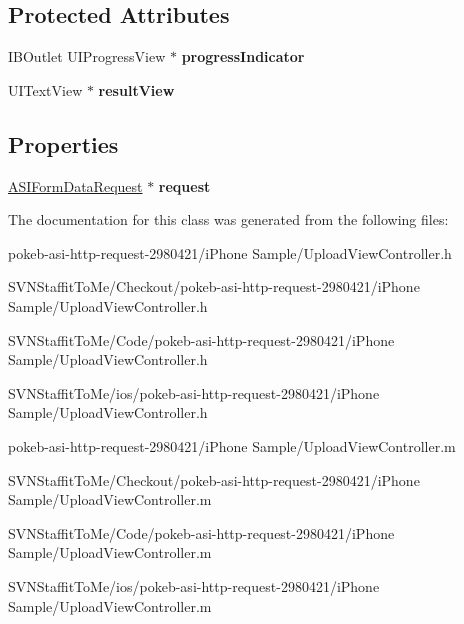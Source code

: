 \subsection*{\-Protected \-Attributes}
\begin{DoxyCompactItemize}
\item 
\hypertarget{interface_upload_view_controller_a226e19c51dcc532ebab1555725f7c46b}{
\-I\-B\-Outlet \-U\-I\-Progress\-View $\ast$ {\bfseries progress\-Indicator}}
\label{interface_upload_view_controller_a226e19c51dcc532ebab1555725f7c46b}

\item 
\hypertarget{interface_upload_view_controller_a7a6ecc9de5717412f3324f4c71274bc9}{
\-U\-I\-Text\-View $\ast$ {\bfseries result\-View}}
\label{interface_upload_view_controller_a7a6ecc9de5717412f3324f4c71274bc9}

\end{DoxyCompactItemize}
\subsection*{\-Properties}
\begin{DoxyCompactItemize}
\item 
\hypertarget{interface_upload_view_controller_a4e811a9ece1ea8a879541784008a02ac}{
\hyperlink{interface_a_s_i_form_data_request}{\-A\-S\-I\-Form\-Data\-Request} $\ast$ {\bfseries request}}
\label{interface_upload_view_controller_a4e811a9ece1ea8a879541784008a02ac}

\end{DoxyCompactItemize}


\-The documentation for this class was generated from the following files\-:\begin{DoxyCompactItemize}
\item 
pokeb-\/asi-\/http-\/request-\/2980421/i\-Phone Sample/\-Upload\-View\-Controller.\-h\item 
\-S\-V\-N\-Staffit\-To\-Me/\-Checkout/pokeb-\/asi-\/http-\/request-\/2980421/i\-Phone Sample/\-Upload\-View\-Controller.\-h\item 
\-S\-V\-N\-Staffit\-To\-Me/\-Code/pokeb-\/asi-\/http-\/request-\/2980421/i\-Phone Sample/\-Upload\-View\-Controller.\-h\item 
\-S\-V\-N\-Staffit\-To\-Me/ios/pokeb-\/asi-\/http-\/request-\/2980421/i\-Phone Sample/\-Upload\-View\-Controller.\-h\item 
pokeb-\/asi-\/http-\/request-\/2980421/i\-Phone Sample/\-Upload\-View\-Controller.\-m\item 
\-S\-V\-N\-Staffit\-To\-Me/\-Checkout/pokeb-\/asi-\/http-\/request-\/2980421/i\-Phone Sample/\-Upload\-View\-Controller.\-m\item 
\-S\-V\-N\-Staffit\-To\-Me/\-Code/pokeb-\/asi-\/http-\/request-\/2980421/i\-Phone Sample/\-Upload\-View\-Controller.\-m\item 
\-S\-V\-N\-Staffit\-To\-Me/ios/pokeb-\/asi-\/http-\/request-\/2980421/i\-Phone Sample/\-Upload\-View\-Controller.\-m\end{DoxyCompactItemize}
